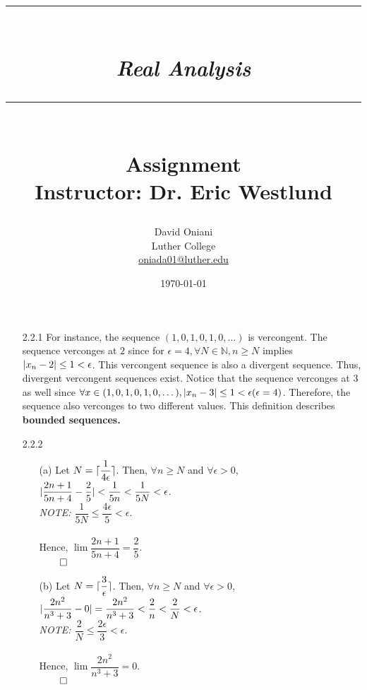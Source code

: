 \documentclass[11pt]{article}
\author{David Oniani\\
        Luther College\\
        \href{mailto:oniada01@luther.edu}{oniada01@luther.edu}}
\title{\rule{\paperwidth - 150pt}{1pt}\textbf{\\\textit{Real Analysis}\\}\rule
{\paperwidth - 150pt}{1pt}\\\textbf{Assignment \textnumero2}\\{\normalsize
Instructor: Dr. Eric Westlund}}
\date{\today}
\DeclarePairedDelimiter\abs{\lvert}{\rvert}%
\DeclarePairedDelimiter{\ceil}{\lceil}{\rceil}
\newcommand{\nats}{\mathbb{N}}
\begin{document}
\maketitle

%
%
%

\begin{itemize}
    \item[2.2.1]
        For instance, the sequence $(1, 0, 1, 0, 1, 0, \dots)$ is vercongent.
        The sequence verconges at $2$ since for $\epsilon = 4, \forall N \in
        \nats, n \geq N$ implies $\abs{x_n - 2} \leq 1 < \epsilon$. This
        vercongent sequence is also a divergent sequence. Thus, divergent
        vercongent sequences exist. Notice that the sequence verconges at $3$
        as well since $\forall x \in (1, 0, 1, 0, 1, 0, \dots), \abs{x_n - 3}
        \leq 1 < \epsilon (\epsilon = 4)$. Therefore, the sequence also
        verconges to two different values. This definition describes
        \textbf{bounded sequences.}

    \item[2.2.2]
        \begin{itemize}
            \item[(a)]
                Let $N = \ceil{\dfrac{1}{4\epsilon}}$. Then, $\forall n \geq N$
                and $\forall \epsilon > 0$, $\abs{\dfrac{2n + 1}{5n + 4} -
                \dfrac{2}{5}} < \dfrac{1}{5n} < \dfrac{1}{5N} < \epsilon$.\\
                \textit{NOTE: $\dfrac{1}{5N} \leq \dfrac{4\epsilon}{5} < 
                \epsilon$}.\\\\
                Hence, $\lim\dfrac{2n + 1}{5n + 4} = \dfrac{2}{5}$.\\
                $\qed$


            \item[(b)]
                Let $N = \ceil{\dfrac{3}{\epsilon}}$. Then, $\forall n \geq N$
                and $\forall \epsilon > 0$, $\abs{\dfrac{2n^2}{n^3 + 3} -
                0} = \dfrac{2n^2}{n^3 + 3} < \dfrac{2}{n} < \dfrac{2}{N} <
                \epsilon$.\\
                \textit{NOTE: $\dfrac{2}{N} \leq \dfrac{2\epsilon}{3} <
                \epsilon$}.\\\\
                Hence, $\lim\dfrac{2n^2}{n^3 + 3} = 0$.\\
                $\qed$


\end{itemize}
\end{itemize}
\end{document}
